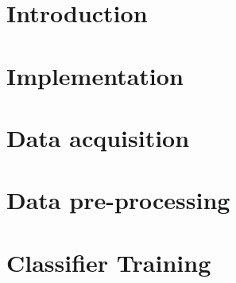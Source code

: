 \documentclass[12pt]{report}
\begin{document}



%
%

\tableofcontents{}
\listoffigures
\listoftables

\chapter{Introduction}



% 

\chapter{Implementation}


\chapter{Data acquisition}
\label{data-acquisition}


\chapter{Data pre-processing}


% 

% 

% 

% 

\chapter{Classifier Training}

\end{document}
